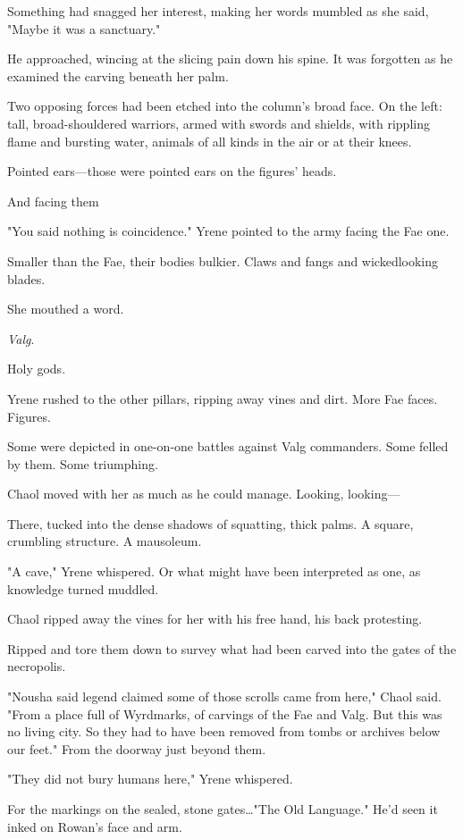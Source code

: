 Something had snagged her interest, making her words mumbled as she said, "Maybe it was a sanctuary."

He approached, wincing at the slicing pain down his spine.
It was forgotten as he examined the carving beneath her palm.

Two opposing forces had been etched into the column's broad face.
On the left: tall, broad-shouldered warriors, armed with swords and shields, with rippling flame and bursting water, animals of all kinds in the air or at their knees.

Pointed ears---those were pointed ears on the figures' heads.

And facing them 

"You said nothing is coincidence."
Yrene pointed to the army facing the Fae one.

Smaller than the Fae, their bodies bulkier.
Claws and fangs and wickedlooking blades.

She mouthed a word.

\emph{Valg}.

Holy gods.

Yrene rushed to the other pillars, ripping away vines and dirt.
More Fae faces.
Figures.

Some were depicted in one-on-one battles against Valg commanders.
Some felled by them.
Some triumphing.

Chaol moved with her as much as he could manage.
Looking, looking---

There, tucked into the dense shadows of squatting, thick palms.
A square, crumbling structure.
A mausoleum.

"A cave," Yrene whispered.
Or what might have been interpreted as one, as knowledge turned muddled.

Chaol ripped away the vines for her with his free hand, his back protesting.

Ripped and tore them down to survey what had been carved into the gates of the necropolis.

"Nousha said legend claimed some of those scrolls came from here," Chaol said.
"From a place full of Wyrdmarks, of carvings of the Fae and Valg.
But this was no living city.
So they had to have been removed from tombs or archives below our feet."
From the doorway just beyond them.

"They did not bury humans here," Yrene whispered.

For the markings on the sealed, stone gates\ldots "The Old Language."
He'd seen it inked on Rowan's face and arm.

